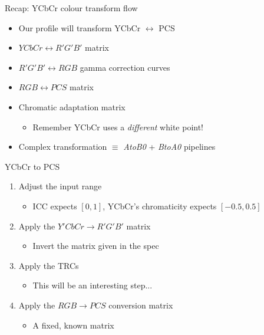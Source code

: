 \documentclass[final, aspectratio=169]{divoc}
\begin{document}
\begin{frame}{Recap: YCbCr colour transform flow}
  \begin{itemize}
    \item Our profile will transform YCbCr $\leftrightarrow$ PCS
    \item $YCbCr \leftrightarrow R'G'B'$ matrix
    \item $R'G'B' \leftrightarrow RGB$ gamma correction curves
    \item $RGB \leftrightarrow PCS$ matrix
    \item Chromatic adaptation matrix
          \begin{itemize}
            \item Remember YCbCr uses a \emph{different} white point!
          \end{itemize}
    \item Complex transformation $\equiv$ \emph{AtoB0} + \emph{BtoA0} pipelines
  \end{itemize}
\end{frame}
\begin{frame}{YCbCr to PCS}
  \begin{enumerate}
    \item Adjust the input range
          \begin{itemize}
            \item ICC expects $[0, 1]$, YCbCr's chromaticity expects $[-0.5, 0.5]$
          \end{itemize}
    \item Apply the $Y'CbCr \rightarrow R'G'B'$ matrix
          \begin{itemize}
            \item Invert the matrix given in the spec
          \end{itemize}
    \item Apply the TRCs
          \begin{itemize}
            \item This will be an interesting step...
          \end{itemize}
    \item Apply the $RGB \rightarrow PCS$ conversion matrix
          \begin{itemize}
            \item A fixed, known matrix \autocite{photosauce3}
          \end{itemize}
  \end{enumerate}
\end{frame}
\end{document}
